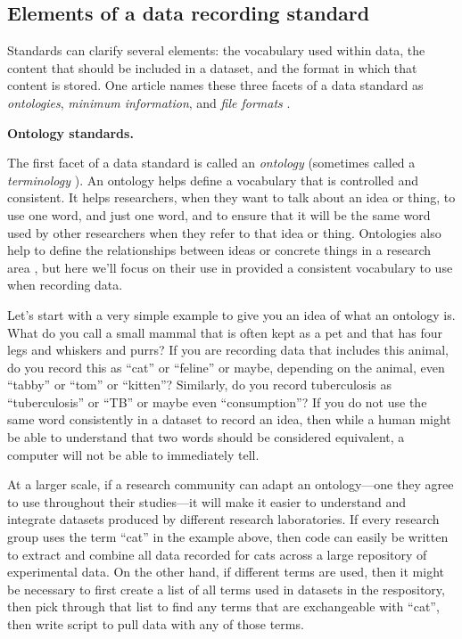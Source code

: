 \documentclass[]{tufte-book}
\begin{document}
\subsection{Elements of a data recording standard}\label{elements-of-a-data-recording-standard}

Standards can clarify several elements: the vocabulary used within data, the
content that should be included in a dataset, and the format in which that
content is stored. One article names these three facets of a data standard as
\emph{ontologies}, \emph{minimum information}, and \emph{file formats} \citep{ghosh2011software}.

\textbf{Ontology standards.}

The first facet of a data standard is called an \emph{ontology} (sometimes called a
\emph{terminology} \citep{sansone2012toward}). An ontology helps define a vocabulary that
is controlled and consistent. It helps researchers, when they want to talk about
an idea or thing, to use one word, and just one word, and to ensure that it will
be the same word used by other researchers when they refer to that idea or
thing. Ontologies also help to define the relationships between ideas or
concrete things in a research area \citep{ghosh2011software}, but here we'll focus on
their use in provided a consistent vocabulary to use when recording data.

Let's start with a very simple example to give you an idea of what an ontology
is. What do you call a small mammal that is often kept as a pet and that has
four legs and whiskers and purrs? If you are recording data that includes this
animal, do you record this as ``cat'' or ``feline'' or maybe, depending on the
animal, even ``tabby'' or ``tom'' or ``kitten''? Similarly, do you record tuberculosis
as ``tuberculosis'' or ``TB'' or maybe even ``consumption''? If you do not use the
same word consistently in a dataset to record an idea, then while a human might
be able to understand that two words should be considered equivalent, a computer
will not be able to immediately tell.

At a larger scale, if a research community can adapt an ontology---one they
agree to use throughout their studies---it will make it easier to understand and
integrate datasets produced by different research laboratories. If every
research group uses the term ``cat'' in the example above, then code can easily be
written to extract and combine all data recorded for cats across a large
repository of experimental data. On the other hand, if different terms are used,
then it might be necessary to first create a list of all terms used in datasets
in the respository, then pick through that list to find any terms that are
exchangeable with ``cat'', then write script to pull data with any of those terms.
\end{document}
